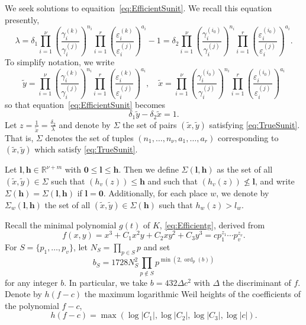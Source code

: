 \documentclass[11pt]{report}
\theoremstyle{definition}
\DeclareMathOperator{\ord}{ord}
\begin{document}
We seek solutions to equaition~\eqref{eq:EfficientSunit}. We recall this equation presently,
\begin{equation*}
\lambda = \delta_1 \prod_{i = 1}^{\nu} \left( \frac{\gamma_i^{(k)}}{\gamma_i^{(j)}}\right)^{n_i} \prod_{i = 1}^r\left( \frac{\varepsilon_i^{(k)}}{\varepsilon_i^{(j)}}\right)^{a_i} - 1 = \delta_2 \prod_{i = 1}^{\nu} \left( \frac{\gamma_i^{(i_0)}}{\gamma_i^{(j)}}\right)^{n_i}\prod_{i = 1}^{r}\left( \frac{\varepsilon_i^{(i_0)}}{\varepsilon_i^{(j)}}\right)^{a_i}.
\end{equation*}
To simplify notation, we write
\[\tilde{y} =  \prod_{i = 1}^{\nu} \left( \frac{\gamma_i^{(k)}}{\gamma_i^{(j)}}\right)^{n_i}\prod_{i = 1}^r\left( \frac{\varepsilon_i^{(k)}}{\varepsilon_i^{(j)}}\right)^{a_i}, \quad
\tilde{x} = \prod_{i = 1}^{\nu} \left( \frac{\gamma_i^{(i_0)}}{\gamma_i^{(j)}}\right)^{n_i}\prod_{i = 1}^{r}\left( \frac{\varepsilon_i^{(i_0)}}{\varepsilon_i^{(j)}}\right)^{a_i}\]
so that equation~\eqref{eq:EfficientSunit} becomes
\begin{equation} \label{eq:TrueSunit}
\delta_1\tilde{y} - \delta_2\tilde{x} = 1.
\end{equation}
Let $z= \frac{1}{\tilde{x}} = \frac{\delta_2}{\lambda}$ and denote by $\Sigma$ the set of pairs $(\tilde{x},\tilde{y})$ satisfying \eqref{eq:TrueSunit}. That is, $\Sigma$ denotes the set of tuples $(n_1, \dots, n_{\nu}, a_1, \dots, a_r)$ corresponding to $(\tilde{x},\tilde{y})$ which satisfy \eqref{eq:TrueSunit}.

Let $\mathbf{l},\mathbf{h}\in\mathbb{R}^{\nu + m}$ with $\mathbf{0}\leq \mathbf{l}\leq \mathbf{h}$. Then we define $\Sigma(\mathbf{l},\mathbf{h})$ as the set of all $(\tilde{x},\tilde{y}) \in \Sigma$ such that $\left(h_v(z)\right)\leq \mathbf{h}$ and such that $\left(h_v(z)\right)\nleq \mathbf{l}$, and write $\Sigma(\mathbf{h})=\Sigma(\mathbf{l},\mathbf{h})$ if $\mathbf{l}=\mathbf{0}$. Additionally, for each place $w$, we denote by $\Sigma_w(\mathbf{l},\mathbf{h})$ the set of all $(\tilde{x},\tilde{y})\in\Sigma(\mathbf{h})$ such that $h_w(z)>l_w$.

Recall the minimal polynomial $g(t)$ of $K$, \eqref{eq:Efficientg}, derived from
\[f(x,y) = x^3 + C_1 x^{2}y + C_2xy^2 + C_3y^3 = cp_1^{z_1}\cdots p_v^{z_v}.\]
For $S = \{p_1, \dots, p_v\}$, let $N_S = \prod_{p\in S}p$ and set
\[b_S	 = 1728 N_S^2 \prod_{p \notin S} p^{\min(2,\ord_p(b))}\]
for any integer $b$. In particular, we take $b = 432 \Delta c^2$ with $\Delta$ the discriminant of $f$. Denote by $h(f-c)$ the maximum logarithmic Weil heights of the coefficients of the polynomial $f - c$,
\[h(f-c) = \max(\log|C_1|, \log|C_2|, \log|C_3|, \log|c|).\]
\end{document}

